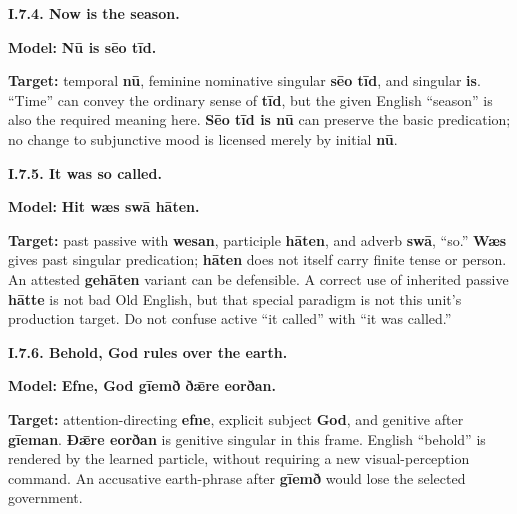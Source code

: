 \par\begin{minipage}{\linewidth}\raggedright
\textbf{I.7.4. Now is the season.}

\textbf{Model:} \textbf{Nū is sēo tīd.}

\textbf{Target:} temporal \textbf{nū}, feminine nominative singular \textbf{sēo tīd}, and singular \textbf{is}. “Time” can convey the ordinary sense of \textbf{tīd}, but the given English “season” is also the required meaning here. \textbf{Sēo tīd is nū} can preserve the basic predication; no change to subjunctive mood is licensed merely by initial \textbf{nū}.

\end{minipage}\par\addvspace{4pt}

\par\begin{minipage}{\linewidth}\raggedright
\textbf{I.7.5. It was so called.}

\textbf{Model:} \textbf{Hit wæs swā hāten.}

\textbf{Target:} past passive with \textbf{wesan}, participle \textbf{hāten}, and adverb \textbf{swā}, “so.” \textbf{Wæs} gives past singular predication; \textbf{hāten} does not itself carry finite tense or person. An attested \textbf{gehāten} variant can be defensible. A correct use of inherited passive \textbf{hātte} is not bad Old English, but that special paradigm is not this unit’s production target. Do not confuse active “it called” with “it was called.”

\end{minipage}\par\addvspace{4pt}

\par\begin{minipage}{\linewidth}\raggedright
\textbf{I.7.6. Behold, God rules over the earth.}

\textbf{Model:} \textbf{Efne, God gīemð ðǣre eorðan.}

\textbf{Target:} attention-directing \textbf{efne}, explicit subject \textbf{God}, and genitive after \textbf{gīeman}. \textbf{Ðǣre eorðan} is genitive singular in this frame. English “behold” is rendered by the learned particle, without requiring a new visual-perception command. An accusative earth-phrase after \textbf{gīemð} would lose the selected government.

\end{minipage}\par\addvspace{4pt}

